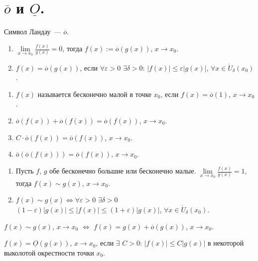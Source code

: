 \documentclass[12pt]{article}
\begin{document}
	\section{$\overline{o}$ и $\underline{O}$.}
	\begin{definition}
		Символ Ландау~--- $\overline{o}$.
		\begin{enumerate}
			\item $\lim\limits_{x \rightarrow x_0} \frac{f(x)}{g(x)} = 0$, тогда $f(x) := \overline{o}(g(x))$, $x \rightarrow x_0$.
			\item $f(x) = \overline{o}(g(x))$, если $\forall \varepsilon > 0$ $\exists \delta > 0$: $|f(x)| \leqslant \varepsilon |g(x)|$, $\forall x \in \mathring{U}_\delta (x_0)$.
		\end{enumerate}
	\end{definition}
	\begin{property}
		\begin{enumerate}
			\item $f(x)$ называется бесконечно малой в точке $x_0$, если $f(x) = \overline{o}(1)$, $x \rightarrow x_0$.
			\item $\overline{o}(f(x)) + \overline{o}(f(x)) = \overline{o}(f(x))$, $x \rightarrow x_0$.
			\item $C \cdot \overline{o}(f(x)) = \overline{o}(f(x))$, $x \rightarrow x_0$.
			\item $\overline{o}(\overline{o}(f(x))) = \overline{o}(f(x))$, $x \rightarrow x_0$.
		\end{enumerate}
	\end{property}
	\begin{definition}
		\begin{enumerate}
			\item Пусть $f$, $g$ обе бесконечно большие или бесконечно малые. $\lim\limits_{x \rightarrow x_0} \frac{f(x)}{g(x)} = 1$, тогда $f(x) \sim g(x)$, $x \rightarrow x_0$.
			\item $f(x) \sim g(x) \Leftrightarrow \forall \varepsilon > 0$ $\exists \delta > 0$ $(1 - \varepsilon)|g(x)| \leqslant |f(x)| \leqslant (1 + \varepsilon)|g(x)|$, $\forall x \in \mathring{U}_\delta (x_0)$.
		\end{enumerate}
	\end{definition}
	\begin{statement}
		$f(x) \sim g(x)$, $x \rightarrow x_0$ $\Leftrightarrow$ $f(x) = g(x) + \overline{o}(g(x))$, $x \rightarrow x_0$.
	\end{statement}
	\begin{definition}
		$f(x) = \underline{O}(g(x))$, $x \rightarrow x_0$, если $\exists$ $C > 0$: $|f(x)| \leqslant C|g(x)|$ в некоторой выколотой окрестности точки $x_0$.
	\end{definition}
\end{document}
